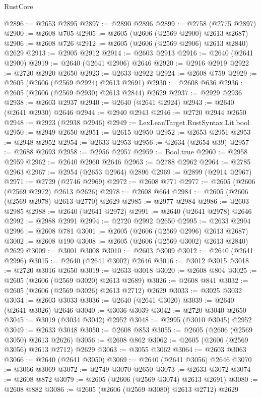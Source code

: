 \begin{lexlean}{RustCore}
\begin{coremodule}
@2896 := @2653 @2895
@2897 := @2890 @2896
@2899 := @2758 (@2775 @2897)
@2900 := @2608 @705
@2905 := @2605 (@2606 (@2569 @2900) @2613 @2687)
@2906 := @2608 @726
@2912 := @2605 (@2606 (@2569 @2906) @2613 @2840) @2629
@2913 := @2905 @2912
@2914 := @2603 @2913
@2916 := @2640 (@2641 @2900)
@2919 := @2640 (@2641 @2906) @2646
@2920 := @2916 @2919
@2922 := @2720 @2920 @2650
@2923 := @2633 @2922
@2924 := @2608 @759
@2929 := @2605 (@2606 (@2569 @2924) @2613 @2691)
@2930 := @2608 @636
@2936 := @2605 (@2606 (@2569 @2930) @2613 @2844) @2629
@2937 := @2929 @2936
@2938 := @2603 @2937
@2940 := @2640 (@2641 @2924)
@2943 := @2640 (@2641 @2930) @2646
@2944 := @2940 @2943
@2946 := @2720 @2944 @2650
@2948 := @2923 (@2938 @2946)
@2949 := LexLeanTarget.RustSyntax.Lit.bool
@2950 := @2949 @2650
@2951 := @2615 @2950
@2952 := @2653 @2951
@2953 := @2948 @2952
@2954 := @2633 @2953
@2956 := @2634 (@2654 @39)
@2957 := @2688 @2693
@2958 := @2956 @2957
@2959 := Bool.true
@2960 := @2958 @2959
@2962 := @2640 @2960 @2646
@2963 := @2788 @2962
@2964 := @2785 @2963
@2967 := @2954 (@2653 @2964) @2896
@2969 := @2899 (@2914 @2967)
@2971 := @2729 (@2746 @2969)
@2972 := @2608 @771
@2977 := @2605 (@2606 (@2569 @2972) @2613 @2626)
@2978 := @2608 @664
@2984 := @2605 (@2606 (@2569 @2978) @2613 @2770) @2629
@2985 := @2977 @2984
@2986 := @2603 @2985
@2988 := @2640 (@2641 @2972)
@2991 := @2640 (@2641 @2978) @2646
@2992 := @2988 @2991
@2994 := @2720 @2992 @2650
@2995 := @2633 @2994
@2996 := @2608 @781
@3001 := @2605 (@2606 (@2569 @2996) @2613 @2687)
@3002 := @2608 @190
@3008 := @2605 (@2606 (@2569 @3002) @2613 @2840) @2629
@3009 := @3001 @3008
@3010 := @2603 @3009
@3012 := @2640 (@2641 @2996)
@3015 := @2640 (@2641 @3002) @2646
@3016 := @3012 @3015
@3018 := @2720 @3016 @2650
@3019 := @2633 @3018
@3020 := @2608 @804
@3025 := @2605 (@2606 (@2569 @3020) @2613 @2689)
@3026 := @2608 @841
@3032 := @2605 (@2606 (@2569 @3026) @2613 @2712) @2629
@3033 := @3025 @3032
@3034 := @2603 @3033
@3036 := @2640 (@2641 @3020)
@3039 := @2640 (@2641 @3026) @2646
@3040 := @3036 @3039
@3042 := @2720 @3040 @2650
@3045 := @3019 (@3034 @3042) @2952
@3048 := @2995 (@3010 @3045) @2952
@3049 := @2633 @3048
@3050 := @2608 @853
@3055 := @2605 (@2606 (@2569 @3050) @2613 @2626)
@3056 := @2608 @862
@3062 := @2605 (@2606 (@2569 @3056) @2613 @2712) @2629
@3063 := @3055 @3062
@3064 := @2603 @3063
@3066 := @2640 (@2641 @3050)
@3069 := @2640 (@2641 @3056) @2646
@3070 := @3066 @3069
@3072 := @2749 @3070 @2650
@3073 := @2633 @3072
@3074 := @2608 @872
@3079 := @2605 (@2606 (@2569 @3074) @2613 @2691)
@3080 := @2608 @882
@3086 := @2605 (@2606 (@2569 @3080) @2613 @2712) @2629

\end{coremodule}
\end{lexlean}
